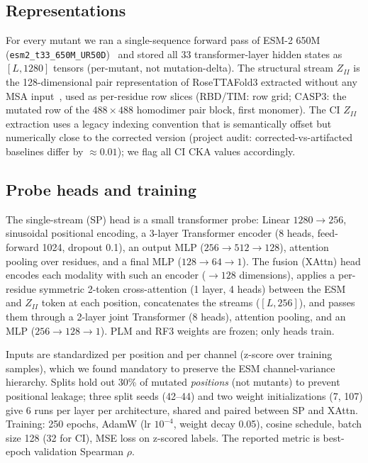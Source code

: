 \documentclass[11pt]{article}
\begin{document}
\subsection{Representations}

For every mutant we ran a single-sequence forward pass of ESM-2 650M
(\texttt{esm2\_t33\_650M\_UR50D})~\cite{lin2023} and stored all 33 transformer-layer hidden
states as $[L,1280]$ tensors (per-mutant, not mutation-delta). The structural stream
$Z_{II}$ is the 128-dimensional pair representation of RoseTTAFold3 extracted without any
MSA input~\cite{corley2025}, used as per-residue row slices (RBD/TIM: row grid; CASP3: the
mutated row of the $488\times488$ homodimer pair block, first monomer). The CI $Z_{II}$
extraction uses a legacy indexing convention that is semantically offset but numerically
close to the corrected version (project audit: corrected-vs-artifacted baselines differ by
$\approx 0.01$); we flag all CI CKA values accordingly.

\subsection{Probe heads and training}

The single-stream (SP) head is a small transformer probe: Linear $1280\!\to\!256$,
sinusoidal positional encoding, a 3-layer Transformer encoder (8 heads, feed-forward 1024,
dropout 0.1), an output MLP ($256\!\to\!512\!\to\!128$), attention pooling over residues,
and a final MLP ($128\!\to\!64\!\to\!1$). The fusion (XAttn) head encodes each modality with
such an encoder ($\to128$ dimensions), applies a per-residue symmetric 2-token
cross-attention (1 layer, 4 heads) between the ESM and $Z_{II}$ token at each position,
concatenates the streams ($[L,256]$), and passes them through a 2-layer joint Transformer
(8 heads), attention pooling, and an MLP ($256\!\to\!128\!\to\!1$). PLM and RF3 weights are
frozen; only heads train.

Inputs are standardized per position and per channel (z-score over training samples), which
we found mandatory to preserve the ESM channel-variance hierarchy. Splits hold out 30\% of
mutated \emph{positions} (not mutants) to prevent positional leakage; three split seeds
(42--44) and two weight initializations (7, 107) give 6 runs per layer per architecture,
shared and paired between SP and XAttn. Training: 250 epochs, AdamW (lr $10^{-4}$, weight
decay 0.05), cosine schedule, batch size 128 (32 for CI), MSE loss on z-scored labels. The
reported metric is best-epoch validation Spearman $\rho$.
\end{document}
